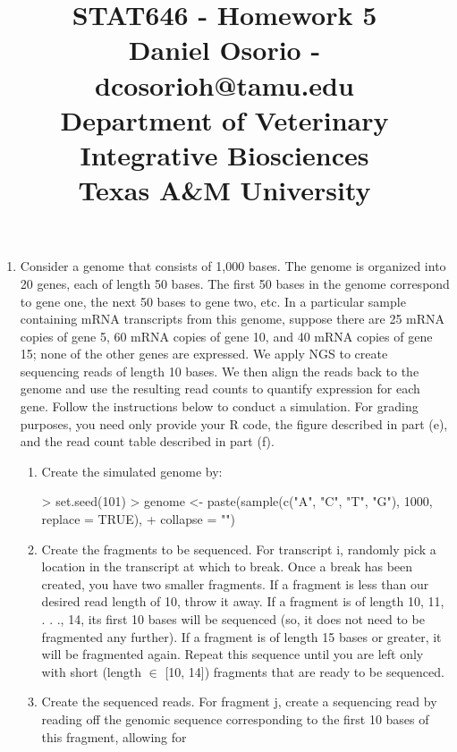 \documentclass[12pt,a4paper]{paper}
\begin{document}
\title{STAT646 - Homework 5\\\small{Daniel Osorio - dcosorioh@tamu.edu\\Department of Veterinary Integrative Biosciences\\Texas A\&M University}}
\maketitle

\begin{enumerate}
\item Consider a genome that consists of 1,000 bases. The genome is organized into 20 genes, each
of length 50 bases. The first 50 bases in the genome correspond to gene one, the next 50
bases to gene two, etc. In a particular sample containing mRNA transcripts from this genome,
suppose there are 25 mRNA copies of gene 5, 60 mRNA copies of gene 10, and 40 mRNA
copies of gene 15; none of the other genes are expressed. We apply NGS to create sequencing
reads of length 10 bases. We then align the reads back to the genome and use the resulting
read counts to quantify expression for each gene. Follow the instructions below to conduct a
simulation. For grading purposes, you need only provide your R code, the figure described in
part (e), and the read count table described in part (f).
\begin{enumerate}
\item Create the simulated genome by:
\begin{Schunk}
\begin{Sinput}
> set.seed(101)
> genome <- paste(sample(c("A", "C", "T", "G"), 1000, replace = TRUE),
+ collapse = "")
\end{Sinput}
\end{Schunk}
\item Create the fragments to be sequenced. For transcript i, randomly pick a location in
the transcript at which to break. Once a break has been created, you have two smaller
fragments. If a fragment is less than our desired read length of 10, throw it away. If a
fragment is of length 10, 11, . . ., 14, its first 10 bases will be sequenced (so, it does not
need to be fragmented any further). If a fragment is of length 15 bases or greater, it will
be fragmented again. Repeat this sequence until you are left only with short (length $\in$
[10, 14]) fragments that are ready to be sequenced.
\item Create the sequenced reads. For fragment j, create a sequencing read by reading off
the genomic sequence corresponding to the first 10 bases of this fragment, allowing for

\end{enumerate}
\end{enumerate}
\end{document}
